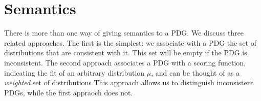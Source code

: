 \documentclass{article}
\theoremstyle{plain}
\theoremstyle{definition}
\theoremstyle{remark}
\newcommand{\modelname}{probabilistic dependency graph}
\newcommand{\modelnames}{\modelname s}
\newcommand{\MN}{PDG}
\newcommand{\MNs}{\MN s}
\numberwithin{equation}{section}
\begin{document}
	\section{Semantics}\label{sec:semantics}
	There is more than one way of giving semantics to a \MN.  We discuss three related approaches.
	The first is the simplest: we associate with a PDG the set of distributions that are consistent with it. This set will be empty if the PDG is inconsistent.
	The second approach associates a PDG with a scoring function,
        indicating the fit of an arbitrary distribution $\mu$, and can
        be thought of as a \emph{weighted} set of distributions
This approach allows us to distinguish inconsistent PDGs, while the first
appraoch does not.        
\end{document}
